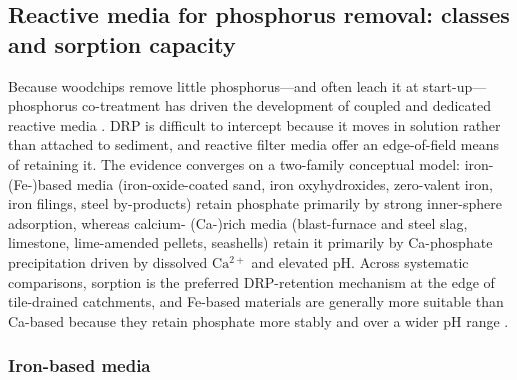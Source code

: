 \documentclass[11pt]{article}
\begin{document}
\subsection{Reactive media for phosphorus removal: classes and sorption capacity}

Because woodchips remove little phosphorus---and often leach it at start-up---phosphorus co-treatment has driven the development of coupled and dedicated reactive media \parencite{Christianson2021}. DRP is difficult to intercept because it moves in solution rather than attached to sediment, and reactive filter media offer an edge-of-field means of retaining it. The evidence converges on a two-family conceptual model: iron- (Fe-)based media (iron-oxide-coated sand, iron oxyhydroxides, zero-valent iron, iron filings, steel by-products) retain phosphate primarily by strong inner-sphere adsorption, whereas calcium- (Ca-)rich media (blast-furnace and steel slag, limestone, lime-amended pellets, seashells) retain it primarily by Ca-phosphate precipitation driven by dissolved $\mathrm{Ca^{2+}}$ and elevated pH. Across systematic comparisons, sorption is the preferred DRP-retention mechanism at the edge of tile-drained catchments, and Fe-based materials are generally more suitable than Ca-based because they retain phosphate more stably and over a wider pH range \parencite{Mendes2022,Li2020}.

\subsubsection{Iron-based media}
\end{document}
